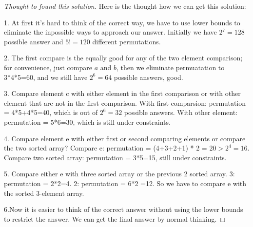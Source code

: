 \documentclass[12pt]{article}
\begin{document}
\begin{proof}[Thought to found this solution]
	Here is the thought how we can get this solution:
	
	1. At first it's hard to think of the correct way, we have to use lower bounds to eliminate the inpossible ways to approach our answer. Initially we have $2^7=128$ possible answer and $5!=120$ different permutations.
	
	2. The first compare is the equally good for any of the two element comparison; for convenience, just compare $a$ and $b$, then we eliminate permuatation to 3*4*5=60, and we still have $2^6=64$ possible answers, good.
	
	3. Compare element c with either element in the first comparison or with other element that are not in the first comparison. With first comparsion: permutation = 4*5+4*5=40, which is out of $2^6=32$ possible answers. With other element: permutation = 5*6=30, which is still under constraints.
	
	4. Compare element e with either first or second comparing elements or compare the two sorted array? Compare e: permutation = (4+3+2+1) * 2 = $20 > 2^4=16$. Compare two sorted array: permutation = 3*5=15, still under constraints.
	
	5. Compare either e with three sorted array or the previous 2 sorted array. 3: permutation = 2*2=4. 2: permutation = 6*2 =12. So we have to compare e with the sorted 3-element array. 
	
	6.Now it is easier to think of the correct answer without using the lower bounds to restrict the answer. We can get the final answer by normal thinking.
\end{proof}
\end{document}

